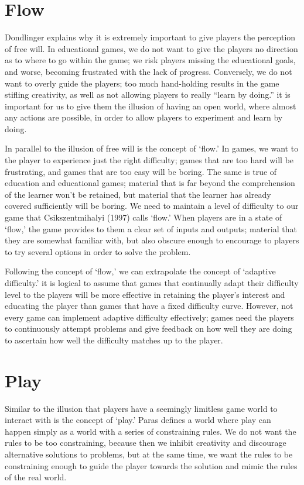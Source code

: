 \documentclass[12pt]{report}
\begin{document}
	\section{Flow}

		Dondlinger \cite{review} explains why it is extremely important to give players the perception of free will. In educational games, we do not want to give the players no direction as to where to go within the game; we risk players missing the educational goals, and worse, becoming frustrated with the lack of progress. Conversely, we do not want to overly guide the players; too much hand-holding results in the game stifling creativity, as well as not allowing players to really “learn by doing.” it is important for us to give them the illusion of having an open world, where almost any actions are possible, in order to allow players to experiment and learn by doing.

		In parallel to the illusion of free will is the concept of `flow.' In games, we want to the player to experience just the right difficulty; games that are too hard will be frustrating, and games that are too easy will be boring. The same is true of education and educational games; material that is far beyond the comprehension of the learner won't be retained, but material that the learner has already covered sufficiently will be boring. We need to maintain a level of difficulty to our game that Csikszentmihalyi (1997) calls `flow.' When players are in a state of `flow,' the game provides to them a clear set of inputs and outputs; material that they are somewhat familiar with, but also obscure enough to encourage to players to try several options in order to solve the problem.

		Following the concept of `flow,' we can extrapolate the concept of `adaptive difficulty.' it is logical to assume that games that continually adapt their difficulty level to the players will be more effective in retaining the player's interest and educating the player than games that have a fixed difficulty curve. However, not every game can implement adaptive difficulty effectively; games need the players to continuously attempt problems and give feedback on how well they are doing to ascertain how well the difficulty matches up to the player.

	\section{Play}

		Similar to the illusion that players have a seemingly limitless game world to interact with is the concept of `play.' Paras \cite{paras} defines a world where play can happen simply as a world with a series of constraining rules. We do not want the rules to be too constraining, because then we inhibit creativity and discourage alternative solutions to problems, but at the same time, we want the rules to be constraining enough to guide the player towards the solution and mimic the rules of the real world.
		
\end{document}
